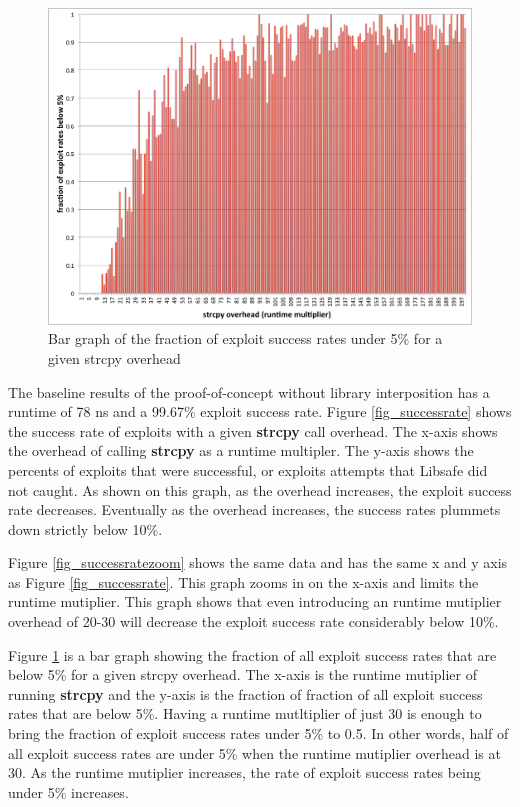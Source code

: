 \documentclass[letterpaper,twocolumn,10pt]{article}
\begin{document}
\begin{figure}
\centering
\includegraphics[width=\textwidth]{ratefraction5.pdf}
\caption{Bar graph of the fraction of exploit success rates under 5\% for a given strcpy overhead}
\label{fig_ratefraction5}
\end{figure}
The baseline results of the proof-of-concept without library interposition has a runtime of 78 ns and a 99.67\% exploit success rate. Figure \ref{fig_successrate} shows the success rate of exploits with a given \textbf{strcpy} call overhead.  The x-axis shows the overhead of calling \textbf{strcpy} as a runtime multipler.  The y-axis shows the percents of exploits that were successful, or exploits attempts that Libsafe did not caught.  As shown on this graph, as the overhead increases, the exploit success rate decreases.  Eventually as the overhead increases, the success rates plummets down strictly below 10\%.

Figure \ref{fig_successratezoom} shows the same data and has the same x and y axis as Figure \ref{fig_successrate}.  This graph zooms in on the x-axis and limits the runtime mutiplier.  This graph shows that even introducing an runtime mutiplier overhead of 20-30 will decrease the exploit success rate considerably below 10\%.

Figure \ref{fig_ratefraction5} is a bar graph showing the fraction of all exploit success rates that are below 5\% for a given strcpy overhead.  The x-axis is the runtime mutiplier of running \textbf{strcpy} and the y-axis is the fraction of fraction of all exploit success rates that are below 5\%.  Having a runtime mutltiplier of just 30 is enough to bring the fraction of exploit success rates under 5\% to 0.5.  In other words, half of all exploit success rates are under 5\% when the runtime mutiplier overhead is at 30.  As the runtime mutiplier increases, the rate  of exploit success rates being under 5\% increases.
\end{document}
